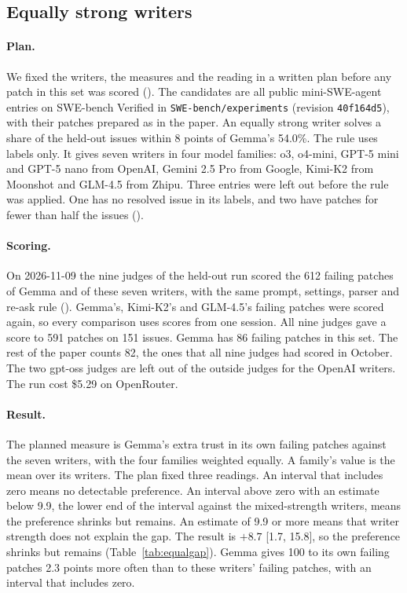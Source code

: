 \documentclass[10pt,letterpaper]{article}
\begin{document}
\subsection*{Equally strong writers}

\paragraph{Plan.} We fixed the writers, the measures and the reading in a written plan before any patch in this set
was scored (). The candidates are all public mini-SWE-agent entries on SWE-bench Verified
in \texttt{SWE-bench/experiments} (revision \texttt{40f164d5}), with their patches prepared as in the paper. An
equally strong writer solves a share of the held-out issues within 8 points of Gemma's 54.0\%. The rule uses labels
only. It gives seven writers in four model families: o3, o4-mini, GPT-5 mini and GPT-5 nano from OpenAI, Gemini 2.5 Pro
from Google, Kimi-K2 from Moonshot and GLM-4.5 from Zhipu. Three entries were left out before the rule was applied.
One has no resolved issue in its labels, and two have patches for fewer than half the issues
().

\paragraph{Scoring.} On 2026-11-09 the nine judges of the held-out run scored the 612 failing patches of Gemma and of
these seven writers, with the same prompt, settings, parser and re-ask rule ().
Gemma's, Kimi-K2's and GLM-4.5's failing patches were scored again, so every comparison uses scores from one session.
All nine judges gave a score to 591 patches on 151 issues. Gemma has 86 failing patches in this set. The rest of the
paper counts 82, the ones that all nine judges had scored in October. The two gpt-oss judges are left out of the
outside judges for the OpenAI writers. The run cost \$5.29 on OpenRouter.

\paragraph{Result.} The planned measure is Gemma's extra trust in its own failing patches against the seven writers,
with the four families weighted equally. A family's value is the mean over its writers. The plan fixed three readings.
An interval that includes zero means no detectable preference. An interval above zero with an estimate below 9.9, the
lower end of the interval against the mixed-strength writers, means the preference shrinks but remains. An estimate of
9.9 or more means that writer strength does not explain the gap. The result is $+8.7$ [1.7, 15.8], so the preference
shrinks but remains (Table~\ref{tab:equalgap}). Gemma gives 100 to its own failing patches 2.3 points more often than
to these writers' failing patches, with an interval that includes zero.
\end{document}
